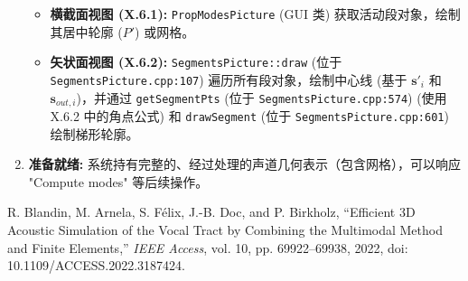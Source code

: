\documentclass{ctexart}
\begin{document}
\begin{enumerate}
        \begin{itemize}
            \item \textbf{横截面视图 (X.6.1):} \texttt{PropModesPicture} (GUI 类) 获取活动段对象，绘制其居中轮廓 (\(P'\)) 或网格。
            \item \textbf{矢状面视图 (X.6.2):} \texttt{SegmentsPicture::draw} (位于 \texttt{SegmentsPicture.cpp:107}) 遍历所有段对象，绘制中心线 (基于 \({\mathbf{s}'}_i\) 和 \(\mathbf{s}_{out,i}\))，并通过 \texttt{getSegmentPts} (位于 \texttt{SegmentsPicture.cpp:574}) (使用 X.6.2 中的角点公式) 和 \texttt{drawSegment} (位于 \texttt{SegmentsPicture.cpp:601}) 绘制梯形轮廓。
        \end{itemize}
    \item \textbf{准备就绪:} 系统持有完整的、经过处理的声道几何表示（包含网格），可以响应 "Compute modes" 等后续操作。
\end{enumerate}

\begin{thebibliography}{9}
    R. Blandin, M. Arnela, S. Félix, J.-B. Doc, and P. Birkholz, ``Efficient 3D Acoustic Simulation of the Vocal Tract by Combining the Multimodal Method and Finite Elements,'' \textit{IEEE Access}, vol. 10, pp. 69922--69938, 2022, doi: 10.1109/ACCESS.2022.3187424.
\end{thebibliography}
\end{document}
